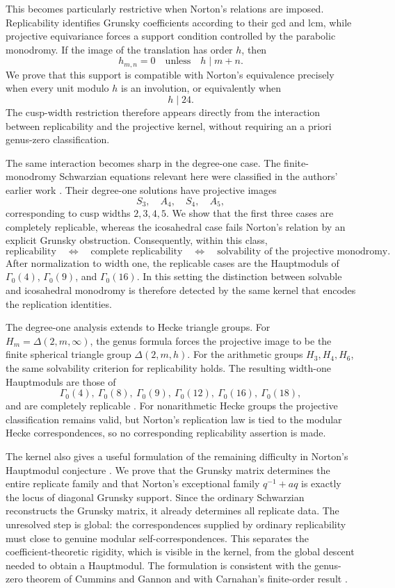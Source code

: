 \documentclass[11pt]{amsart}
\theoremstyle{definition}
\theoremstyle{remark}
\numberwithin{equation}{section}
\begin{document}
This becomes particularly restrictive when Norton's relations are imposed. Replicability identifies Grunsky coefficients according to their gcd and lcm, while projective equivariance forces a support condition controlled by the parabolic monodromy. If the image of the translation has order $h$, then
\[
h_{m,n}=0\quad\text{unless}\quad h\mid m+n.
\]
We prove that this support is compatible with Norton's equivalence precisely when every unit modulo $h$ is an involution, or equivalently when
\[
h\mid24.
\]
The cusp-width restriction therefore appears directly from the interaction between replicability and the projective kernel, without requiring an a priori genus-zero classification.

The same interaction becomes sharp in the degree-one case. The finite-monodromy Schwarzian equations relevant here were classified in the authors' earlier work \cite{forum}. Their degree-one solutions have projective images
\[
S_3,\quad A_4,\quad S_4,\quad A_5,
\]
corresponding to cusp widths $2,3,4,5$. We show that the first three cases are completely replicable, whereas the icosahedral case fails Norton's relation by an explicit Grunsky obstruction. Consequently, within this class,
\[
\text{replicability}
\quad\Longleftrightarrow\quad
\text{complete replicability}
\quad\Longleftrightarrow\quad
\text{solvability of the projective monodromy}.
\]
After normalization to width one, the replicable cases are the Hauptmoduls of $\Gamma_0(4)$, $\Gamma_0(9)$, and $\Gamma_0(16)$. In this setting the distinction between solvable and icosahedral monodromy is therefore detected by the same kernel that encodes the replication identities.

The degree-one analysis extends to Hecke triangle groups. For $H_m=\Delta(2,m,\infty)$, the genus formula forces the projective image to be the finite spherical triangle group $\Delta(2,m,h)$. For the arithmetic groups $H_3,H_4,H_6$, the same solvability criterion for replicability holds. The resulting width-one Hauptmoduls are those of
\[
\Gamma_0(4),\ \Gamma_0(8),\ \Gamma_0(9),\ \Gamma_0(12),\ \Gamma_0(16),\ \Gamma_0(18),
\]
and are completely replicable \cite{alexander-replicable,ford-mckay-norton}. For nonarithmetic Hecke groups the projective classification remains valid, but Norton's replication law is tied to the modular Hecke correspondences, so no corresponding replicability assertion is made.

The kernel also gives a useful formulation of the remaining difficulty in Norton's Hauptmodul conjecture \cite{norton-more,cummins-norton}. We prove that the Grunsky matrix determines the entire replicate family and that Norton's exceptional family $q^{-1}+aq$ is exactly the locus of diagonal Grunsky support. Since the ordinary Schwarzian reconstructs the Grunsky matrix, it already determines all replicate data. The unresolved step is global: the correspondences supplied by ordinary replicability must close to genuine modular self-correspondences. This separates the coefficient-theoretic rigidity, which is visible in the kernel, from the global descent needed to obtain a Hauptmodul. The formulation is consistent with the genus-zero theorem of Cummins and Gannon \cite{cummins-gannon} and with Carnahan's finite-order result \cite{carnahan}.
\end{document}
